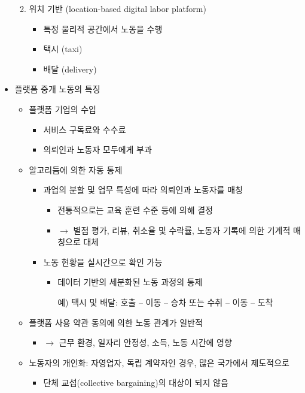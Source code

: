 \begin{itemize}
\begin{enumerate}
\begin{itemize}
		\end{itemize}
	\item 위치 기반 (location-based digital labor platform)
		\begin{itemize}
		\item 특정 물리적 공간에서 노동을 수행
		\item 택시 (taxi)
		\item 배달 (delivery)	
		\end{itemize}
	\end{enumerate}
\item 플랫폼 중개 노동의 특징 \citep{Fernandez-Macias:2018wq}
	\begin{itemize}
	\item 플랫폼 기업의 수입
		\begin{itemize}
		\item 서비스 구독료와 수수료
		\item 의뢰인과 노동자 모두에게 부과
		\end{itemize}
	\item 알고리듬에 의한 자동 통제
		\begin{itemize}
		\item 과업의 분할 및 업무 특성에 따라 의뢰인과 노동자를 매칭
			\begin{itemize}
			\item 전통적으로는 교육 훈련 수준 등에 의해 결정
			\item $\rightarrow$ 별점 평가, 리뷰, 취소율 및 수락률, 노동자 기록에 의한 기계적 매칭으로 대체
			\end{itemize}
		\item 노동 현황을 실시간으로 확인 가능
			\begin{itemize}
			\item 데이터 기반의 세분화된 노동 과정의 통제
			\item[예)] 택시 및 배달: 호출 -- 이동 -- 승차 또는 수취 -- 이동 -- 도착
			\end{itemize}
		\end{itemize}	
	\item 플랫폼 사용 약관 동의에 의한 노동 관계가 일반적
		\begin{itemize}
		\item $\rightarrow$ 근무 환경, 일자리 안정성, 소득, 노동 시간에 영향
		\end{itemize}
	\item 노동자의 개인화: 자영업자, 독립 계약자인 경우, 많은 국가에서 제도적으로
		\begin{itemize}
		\item 단체 교섭(collective bargaining)의 대상이 되지 않음

\end{itemize}
\end{itemize}
\end{itemize}
